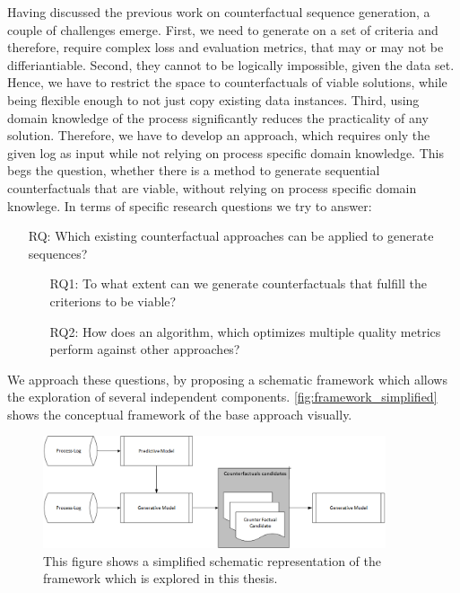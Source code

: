 \documentclass[./../../paper.tex]{subfiles}
\begin{document}
Having discussed the previous work on counterfactual sequence generation, a couple of challenges emerge. 
First, we need to generate on a set of criteria and therefore, require complex loss and evaluation metrics, that may or may not be differiantiable. Second, they cannot to be logically impossible, given the data set. 
Hence, we have to restrict the space to counterfactuals of viable solutions, while being flexible enough to not just copy existing data instances. 
Third, using domain knowledge of the process significantly reduces the practicality of any solution. Therefore, we have to develop an approach, which requires only the given log as input while not relying on process specific domain knowledge. This begs the question, whether there is a method to generate sequential counterfactuals that are viable, without relying on process specific domain knowlege. In terms of specific research questions we try to answer:

\begin{itemize}
    \item[RQ:] Which existing counterfactual approaches can be applied to generate sequences?
    \begin{itemize}
        \item[RQ1:] To what extent can we generate counterfactuals that fulfill the criterions to be viable?
        \item[RQ2:] How does an algorithm, which optimizes multiple quality metrics perform against other approaches?  
    \end{itemize}
\end{itemize}

\noindent We approach these questions, by proposing a schematic framework which allows the exploration of several independent components. \autoref{fig:framework_simplified} shows the conceptual framework of the base approach visually.

\begin{figure}[htb]
    \label{fig:framework_simplified}
    \centering
    \includegraphics[width=0.9\textwidth]{figures/framework_simplified.png}
    \caption{This figure shows a simplified schematic representation of the framework which is explored in this thesis.}
\end{figure}
\end{document}
